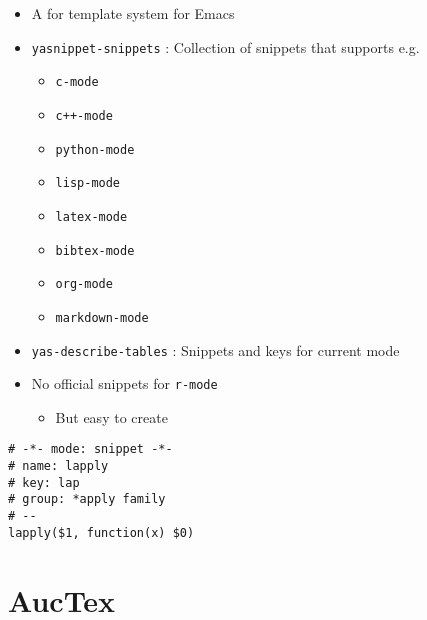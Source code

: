 \documentclass[11pt]{article}
\begin{document}
\begin{itemize}
\item A for template system for Emacs

\item \texttt{yasnippet-snippets} : Collection of snippets that supports e.g.
\begin{itemize}
\item \texttt{c-mode}
\item \texttt{c++-mode}
\item \texttt{python-mode}
\item \texttt{lisp-mode}
\item \texttt{latex-mode}
\item \texttt{bibtex-mode}
\item \texttt{org-mode}
\item \texttt{markdown-mode}
\end{itemize}

\item \texttt{yas-describe-tables} : Snippets and keys for current mode

\item No official snippets for \texttt{r-mode}
\begin{itemize}
\item But easy to create
\end{itemize}
\end{itemize}

\begin{verbatim}
# -*- mode: snippet -*-
# name: lapply
# key: lap
# group: *apply family
# --
lapply($1, function(x) $0)
\end{verbatim}

\section{AucTex}
\label{sec:org5cdf965}
\end{document}
